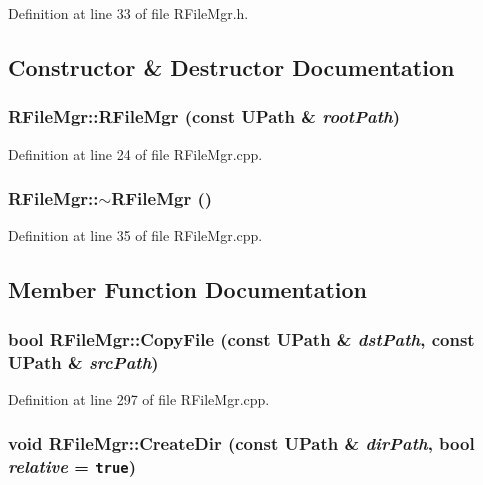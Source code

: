 Definition at line 33 of file RFileMgr.h.

\subsection{Constructor \& Destructor Documentation}
\hypertarget{class_r_file_mgr_8de8601bc8f586106709bd1ee6dc0801}{
\subsubsection[{RFileMgr}]{\setlength{\rightskip}{0pt plus 5cm}RFileMgr::RFileMgr (const {\bf UPath} \& {\em rootPath})}}
\label{class_r_file_mgr_8de8601bc8f586106709bd1ee6dc0801}




Definition at line 24 of file RFileMgr.cpp.\hypertarget{class_r_file_mgr_3f092fc3435b44d499a21f23d1a30adc}{
\subsubsection[{$\sim$RFileMgr}]{\setlength{\rightskip}{0pt plus 5cm}RFileMgr::$\sim$RFileMgr ()}}
\label{class_r_file_mgr_3f092fc3435b44d499a21f23d1a30adc}




Definition at line 35 of file RFileMgr.cpp.

\subsection{Member Function Documentation}
\hypertarget{class_r_file_mgr_c3aa1b38e976cf9e75c81afb40522751}{
\subsubsection[{CopyFile}]{\setlength{\rightskip}{0pt plus 5cm}bool RFileMgr::CopyFile (const {\bf UPath} \& {\em dstPath}, \/  const {\bf UPath} \& {\em srcPath})}}
\label{class_r_file_mgr_c3aa1b38e976cf9e75c81afb40522751}




Definition at line 297 of file RFileMgr.cpp.\hypertarget{class_r_file_mgr_60eda25b74c9062989d18a118ccdb68b}{
\subsubsection[{CreateDir}]{\setlength{\rightskip}{0pt plus 5cm}void RFileMgr::CreateDir (const {\bf UPath} \& {\em dirPath}, \/  bool {\em relative} = {\tt true})}}
\label{class_r_file_mgr_60eda25b74c9062989d18a118ccdb68b}




